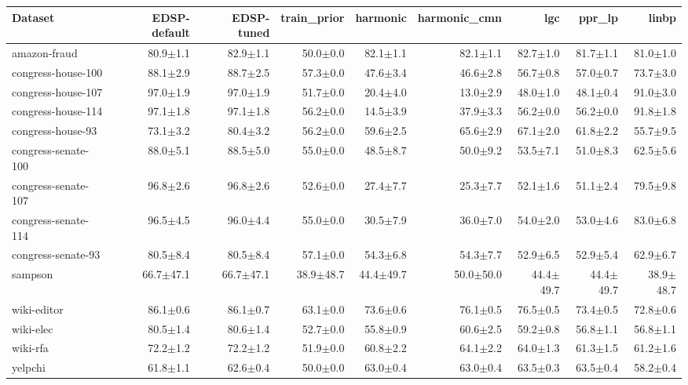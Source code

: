\begin{tabular}{lrrrrrrrr}
\toprule
Dataset & EDSP-default & EDSP-tuned & train\_prior & harmonic & harmonic\_cmn & lgc & ppr\_lp & linbp \\
\midrule
amazon-fraud & 80.9$\pm$1.1 & 82.9$\pm$1.1 & 50.0$\pm$0.0 & 82.1$\pm$1.1 & 82.1$\pm$1.1 & 82.7$\pm$1.0 & 81.7$\pm$1.1 & 81.0$\pm$1.0 \\
congress-house-100 & 88.1$\pm$2.9 & 88.7$\pm$2.5 & 57.3$\pm$0.0 & 47.6$\pm$3.4 & 46.6$\pm$2.8 & 56.7$\pm$0.8 & 57.0$\pm$0.7 & 73.7$\pm$3.0 \\
congress-house-107 & 97.0$\pm$1.9 & 97.0$\pm$1.9 & 51.7$\pm$0.0 & 20.4$\pm$4.0 & 13.0$\pm$2.9 & 48.0$\pm$1.0 & 48.1$\pm$0.4 & 91.0$\pm$3.0 \\
congress-house-114 & 97.1$\pm$1.8 & 97.1$\pm$1.8 & 56.2$\pm$0.0 & 14.5$\pm$3.9 & 37.9$\pm$3.3 & 56.2$\pm$0.0 & 56.2$\pm$0.0 & 91.8$\pm$1.8 \\
congress-house-93 & 73.1$\pm$3.2 & 80.4$\pm$3.2 & 56.2$\pm$0.0 & 59.6$\pm$2.5 & 65.6$\pm$2.9 & 67.1$\pm$2.0 & 61.8$\pm$2.2 & 55.7$\pm$9.5 \\
congress-senate-100 & 88.0$\pm$5.1 & 88.5$\pm$5.0 & 55.0$\pm$0.0 & 48.5$\pm$8.7 & 50.0$\pm$9.2 & 53.5$\pm$7.1 & 51.0$\pm$8.3 & 62.5$\pm$5.6 \\
congress-senate-107 & 96.8$\pm$2.6 & 96.8$\pm$2.6 & 52.6$\pm$0.0 & 27.4$\pm$7.7 & 25.3$\pm$7.7 & 52.1$\pm$1.6 & 51.1$\pm$2.4 & 79.5$\pm$9.8 \\
congress-senate-114 & 96.5$\pm$4.5 & 96.0$\pm$4.4 & 55.0$\pm$0.0 & 30.5$\pm$7.9 & 36.0$\pm$7.0 & 54.0$\pm$2.0 & 53.0$\pm$4.6 & 83.0$\pm$6.8 \\
congress-senate-93 & 80.5$\pm$8.4 & 80.5$\pm$8.4 & 57.1$\pm$0.0 & 54.3$\pm$6.8 & 54.3$\pm$7.7 & 52.9$\pm$6.5 & 52.9$\pm$5.4 & 62.9$\pm$6.7 \\
sampson & 66.7$\pm$47.1 & 66.7$\pm$47.1 & 38.9$\pm$48.7 & 44.4$\pm$49.7 & 50.0$\pm$50.0 & 44.4$\pm$49.7 & 44.4$\pm$49.7 & 38.9$\pm$48.7 \\
wiki-editor & 86.1$\pm$0.6 & 86.1$\pm$0.7 & 63.1$\pm$0.0 & 73.6$\pm$0.6 & 76.1$\pm$0.5 & 76.5$\pm$0.5 & 73.4$\pm$0.5 & 72.8$\pm$0.6 \\
wiki-elec & 80.5$\pm$1.4 & 80.6$\pm$1.4 & 52.7$\pm$0.0 & 55.8$\pm$0.9 & 60.6$\pm$2.5 & 59.2$\pm$0.8 & 56.8$\pm$1.1 & 56.8$\pm$1.1 \\
wiki-rfa & 72.2$\pm$1.2 & 72.2$\pm$1.2 & 51.9$\pm$0.0 & 60.8$\pm$2.2 & 64.1$\pm$2.2 & 64.0$\pm$1.3 & 61.3$\pm$1.5 & 61.2$\pm$1.6 \\
yelpchi & 61.8$\pm$1.1 & 62.6$\pm$0.4 & 50.0$\pm$0.0 & 63.0$\pm$0.4 & 63.0$\pm$0.4 & 63.5$\pm$0.3 & 63.5$\pm$0.4 & 58.2$\pm$0.4 \\
\bottomrule
\end{tabular}
